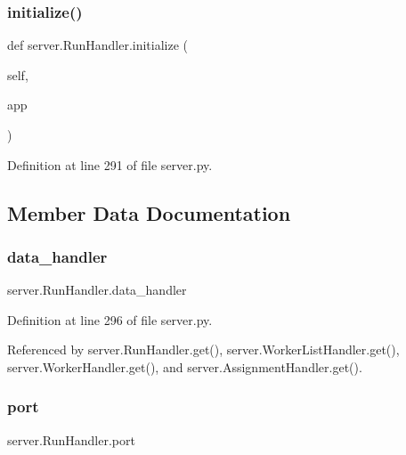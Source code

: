 \subsubsection{\texorpdfstring{initialize()}{initialize()}}
{\footnotesize\ttfamily def server.\+Run\+Handler.\+initialize (\begin{DoxyParamCaption}\item[{}]{self,  }\item[{}]{app }\end{DoxyParamCaption})}



Definition at line 291 of file server.\+py.



\subsection{Member Data Documentation}
\mbox{\label{classserver_1_1RunHandler_a977e83ee067ba61e59ff882a8e5b8e8b}} 
\subsubsection{\texorpdfstring{data\+\_\+handler}{data\_handler}}
{\footnotesize\ttfamily server.\+Run\+Handler.\+data\+\_\+handler}



Definition at line 296 of file server.\+py.



Referenced by server.\+Run\+Handler.\+get(), server.\+Worker\+List\+Handler.\+get(), server.\+Worker\+Handler.\+get(), and server.\+Assignment\+Handler.\+get().

\mbox{\label{classserver_1_1RunHandler_a4fb5d23f976a5ada0b5647a78f162400}} 
\subsubsection{\texorpdfstring{port}{port}}
{\footnotesize\ttfamily server.\+Run\+Handler.\+port}




